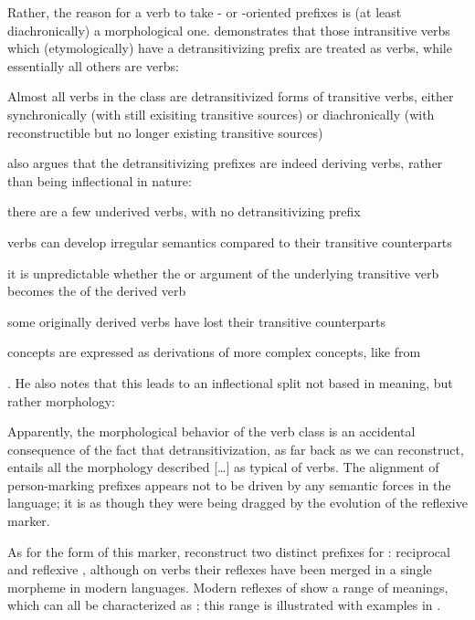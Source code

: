 Rather, the reason for a verb to take - or -oriented prefixes is (at least diachronically) a morphological one.
\textcite[217--221]{meira2000split} demonstrates that those intransitive verbs which (etymologically) have a detransitivizing prefix are treated as  verbs, while essentially all others are  verbs:
\begin{quotebox}{\parencite[201]{meira2000split}}
	Almost all verbs in the  class are detransitivized forms of transitive verbs, either synchronically (with still exisiting transitive sources) or diachronically (with reconstructible but no longer existing transitive sources)
\end{quotebox}
\textcite[221--223]{meira2000split} also argues that the detransitivizing prefixes are indeed deriving  verbs, rather than being inflectional in nature:
\begin{inlinelist}
	\item there are a few underived  verbs, with no detransitivizing prefix
	\item {} verbs can develop irregular semantics compared to their transitive counterparts
	\item it is unpredictable whether the  or  argument of the underlying transitive verb becomes the  of the derived  verb
	\item some originally derived  verbs have lost their transitive counterparts
	\item {} concepts are expressed as derivations of more complex concepts, like  from 
\end{inlinelist}.
He also notes that this leads to an inflectional split not based in meaning, but rather morphology:

\begin{quotebox}{\parencite[226]{meira2000split}}
	Apparently, the morphological behavior of the  verb class is an accidental consequence of the fact that detransitivization, as far back as we can reconstruct, entails all the morphology described […] as typical of  verbs. The alignment of person-marking prefixes appears not to be driven by any semantic forces in the language; it is as though they were being dragged by the evolution of the reflexive marker.
\end{quotebox}

As for the form of this marker, \textcite[505--512]{meira2010origin} reconstruct two distinct  prefixes for \PC: reciprocal  and reflexive , although on verbs their reflexes have been merged in a single morpheme in modern languages.
Modern reflexes of \detrz show a range of meanings, which can all be characterized as ; this range is illustrated with \trio examples in .

